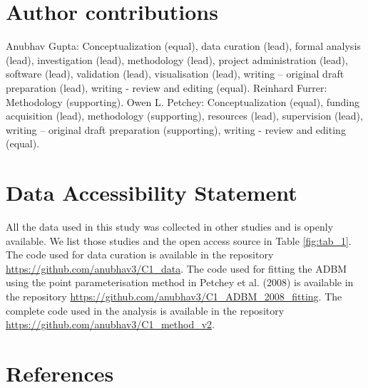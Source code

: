 \documentclass{article}
\begin{document}
\hypertarget{author-contributions}{%
\section{Author contributions}\label{author-contributions}}

Anubhav Gupta: Conceptualization (equal), data curation (lead), formal
analysis (lead), investigation (lead), methodology (lead), project
administration (lead), software (lead), validation (lead), visualisation
(lead), writing -- original draft preparation (lead), writing - review
and editing (equal). Reinhard Furrer: Methodology (supporting). Owen L.
Petchey: Conceptualization (equal), funding acquisition (lead),
methodology (supporting), resources (lead), supervision (lead), writing
-- original draft preparation (supporting), writing - review and editing
(equal).

\hypertarget{data-accessibility-statement}{%
\section{Data Accessibility
Statement}\label{data-accessibility-statement}}

All the data used in this study was collected in other studies and is
openly available. We list those studies and the open access source in
Table \ref{fig:tab_1}. The code used for data curation is available in
the repository \url{https://github.com/anubhav3/C1_data}. The code used
for fitting the ADBM using the point parameterisation method in Petchey
et al. (2008) is available in the repository
\url{https://github.com/anubhav3/C1_ADBM_2008_fitting}. The complete
code used in the analysis is available in the repository
\url{https://github.com/anubhav3/C1_method_v2}.

\hypertarget{references}{%
\section*{References}\label{references}}
\end{document}
